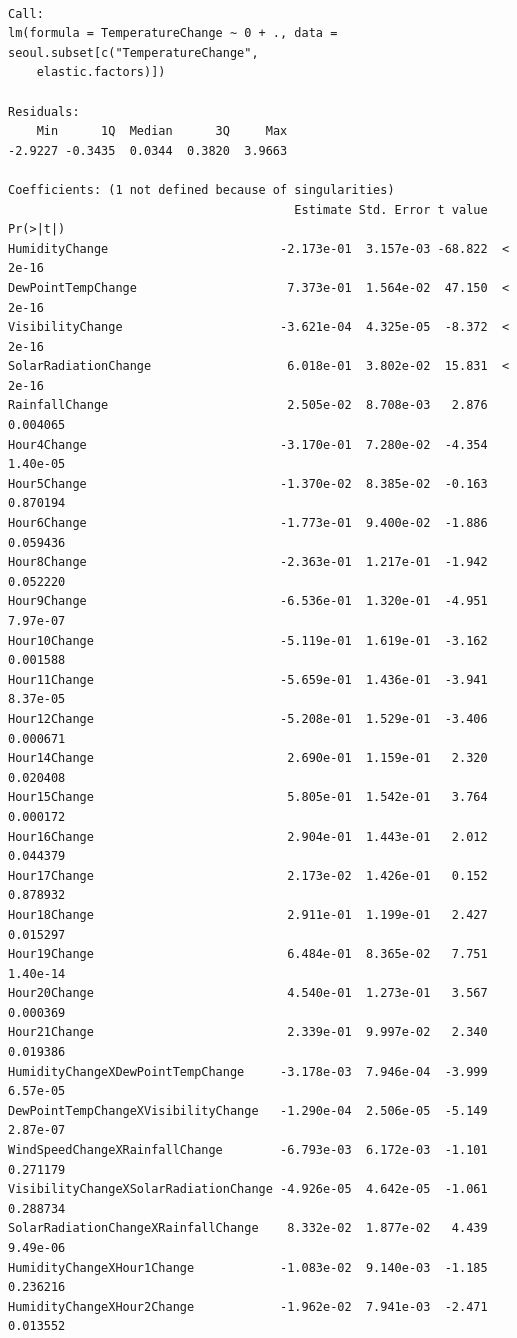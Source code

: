 \documentclass[
  letterpaper,
  DIV=11,
  numbers=noendperiod]{scrartcl}
\begin{document}
\begin{verbatim}

Call:
lm(formula = TemperatureChange ~ 0 + ., data = seoul.subset[c("TemperatureChange", 
    elastic.factors)])

Residuals:
    Min      1Q  Median      3Q     Max 
-2.9227 -0.3435  0.0344  0.3820  3.9663 

Coefficients: (1 not defined because of singularities)
                                        Estimate Std. Error t value Pr(>|t|)
HumidityChange                        -2.173e-01  3.157e-03 -68.822  < 2e-16
DewPointTempChange                     7.373e-01  1.564e-02  47.150  < 2e-16
VisibilityChange                      -3.621e-04  4.325e-05  -8.372  < 2e-16
SolarRadiationChange                   6.018e-01  3.802e-02  15.831  < 2e-16
RainfallChange                         2.505e-02  8.708e-03   2.876 0.004065
Hour4Change                           -3.170e-01  7.280e-02  -4.354 1.40e-05
Hour5Change                           -1.370e-02  8.385e-02  -0.163 0.870194
Hour6Change                           -1.773e-01  9.400e-02  -1.886 0.059436
Hour8Change                           -2.363e-01  1.217e-01  -1.942 0.052220
Hour9Change                           -6.536e-01  1.320e-01  -4.951 7.97e-07
Hour10Change                          -5.119e-01  1.619e-01  -3.162 0.001588
Hour11Change                          -5.659e-01  1.436e-01  -3.941 8.37e-05
Hour12Change                          -5.208e-01  1.529e-01  -3.406 0.000671
Hour14Change                           2.690e-01  1.159e-01   2.320 0.020408
Hour15Change                           5.805e-01  1.542e-01   3.764 0.000172
Hour16Change                           2.904e-01  1.443e-01   2.012 0.044379
Hour17Change                           2.173e-02  1.426e-01   0.152 0.878932
Hour18Change                           2.911e-01  1.199e-01   2.427 0.015297
Hour19Change                           6.484e-01  8.365e-02   7.751 1.40e-14
Hour20Change                           4.540e-01  1.273e-01   3.567 0.000369
Hour21Change                           2.339e-01  9.997e-02   2.340 0.019386
HumidityChangeXDewPointTempChange     -3.178e-03  7.946e-04  -3.999 6.57e-05
DewPointTempChangeXVisibilityChange   -1.290e-04  2.506e-05  -5.149 2.87e-07
WindSpeedChangeXRainfallChange        -6.793e-03  6.172e-03  -1.101 0.271179
VisibilityChangeXSolarRadiationChange -4.926e-05  4.642e-05  -1.061 0.288734
SolarRadiationChangeXRainfallChange    8.332e-02  1.877e-02   4.439 9.49e-06
HumidityChangeXHour1Change            -1.083e-02  9.140e-03  -1.185 0.236216
HumidityChangeXHour2Change            -1.962e-02  7.941e-03  -2.471 0.013552

\end{verbatim}
\end{document}
